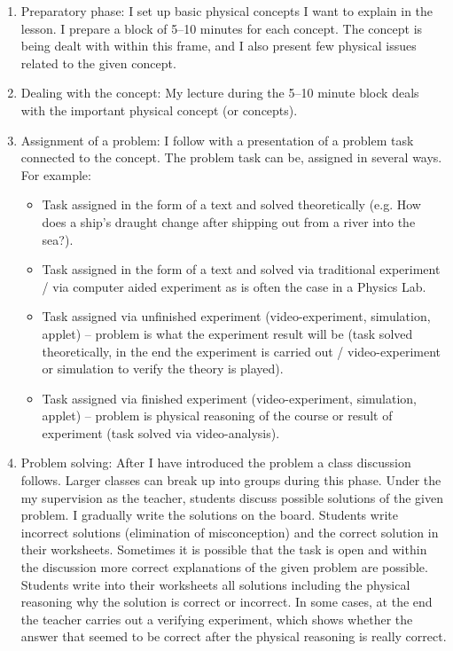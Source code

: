 \documentclass[11pt, a4paper]{awesome-cv}
\begin{document}
\begin{cvletter}
\begin{enumerate}
	\item Preparatory phase: I set up basic physical concepts I want to explain in the lesson. I prepare a block of 5–10 minutes for each concept. The concept is being dealt with within this frame, and I also present few physical issues related to the given concept.

	\item Dealing with the concept: My lecture during the 5–10 minute block deals with the important physical concept (or concepts).
	
	\item Assignment of a problem: I follow with a presentation of a problem task connected to the concept. The problem task can be, assigned in several ways.  For example:
	
	\begin{itemize}
		\item Task assigned in the form of a text and solved theoretically (e.g. How does a ship’s draught change after shipping out from a river into the sea?).
		\item Task assigned in the form of a text and solved via traditional experiment / via computer aided experiment as is often the case in a Physics Lab.
		\item Task assigned via unfinished experiment (video-experiment, simulation, applet) – problem is what the experiment result will be (task solved theoretically, in the end the experiment is carried out / video-experiment or simulation to verify the theory is played).
		\item Task assigned via finished experiment (video-experiment, simulation, applet) – problem is physical reasoning of the course or result of experiment (task solved via video-analysis).
	\end{itemize}
	
	\item Problem solving: After I have introduced the problem a class discussion follows.  Larger classes can break up into groups during this phase. Under the my supervision as the teacher, students discuss possible solutions of the given problem. I gradually write the solutions on the board.  Students write incorrect solutions (elimination of misconception) and the correct solution in their worksheets.  Sometimes it is possible that the task is open and within the discussion more correct explanations of the given problem are possible.  Students write into their worksheets all solutions including the physical reasoning why the solution is correct or incorrect. In some cases, at the end the teacher carries out a verifying experiment, which shows whether the answer that seemed to be correct after the physical reasoning is really correct.
	

\end{enumerate}
\end{cvletter}
\end{document}
